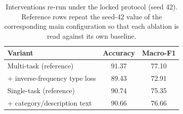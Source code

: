 \begin{table}[t]
\caption{Interventions re-run under the locked protocol (seed 42). Reference rows repeat the seed-42 value of the corresponding main configuration so that each ablation is read against its own baseline.}
\label{tab:ablation}
\centering
\small
\begin{tabular}{@{}lcc@{}}
\toprule
Variant & Accuracy & Macro-F1 \\
\midrule
Multi-task (reference) & 91.37 & 77.10 \\
\quad + inverse-frequency type loss & 89.43 & 72.91 \\
Single-task (reference) & 90.74 & 75.35 \\
\quad + category/description text & 90.66 & 76.66 \\

\bottomrule
\end{tabular}
\end{table}
